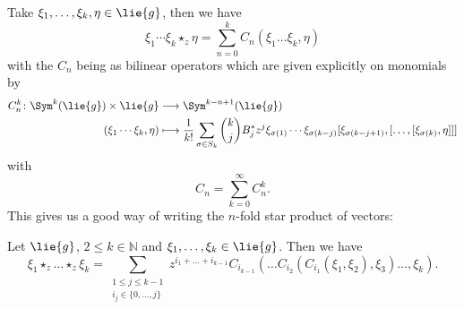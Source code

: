 Take $\xi_1, \ldots, \xi_k, \eta \in \lie{g}$, then we have
\begin{equation*}
	\xi_1 \cdots \xi_k \star_z \eta
	=
	\sum\limits_{n = 0}^k 
	C_n \left( \xi_1 \ldots \xi_k, \eta \right)
\end{equation*}
with the $C_n$ being as bilinear operators which are given explicitly 
on monomials by
\begin{align}
	\label{Formulas:MultipleStarDef1}
	C_n^k
	\colon
	\Sym^k(\lie{g})
	\times
	\lie{g}
	& 
	\longrightarrow
	\Sym^{k - n + 1}(\lie{g})
	\\
	\label{Formulas:MultipleStarDef2}
	(\xi_1 \cdots \xi_k, \eta)
	&
	\longmapsto
	\frac{1}{k!}
	\sum\limits_{\sigma \in S_k}
	\binom{k}{j} B_j^* z^j
	\xi_{\sigma(1)} \cdots \xi_{\sigma(k-j)}
	[\xi_{\sigma(k-j+1)}, [ \ldots, [\xi_{\sigma(k)}, \eta]]] 
\end{align}
with
\begin{equation*}
	C_n 
	= 
	\sum\limits_{k = 0}^{\infty}
	C_n^k.
\end{equation*}
This gives us a good way of writing the $n$-fold star product of vectors:
\begin{proposition}
	\label{Formulas:Prop:MultipleStars}
	Let $\lie{g}$, $2 \leq k \in \mathbb{N}$  and $\xi_1, \ldots, \xi_k 
	\in \lie{g}$. Then we have
	\begin{equation}
		\label{Formulas:MultipleStars}
		\xi_1 \star_z \ldots \star_z \xi_k		
		=
		\sum\limits_{\substack{
			1 \leq j \leq k-1 \\
			i_j \in \{0, \ldots, j\}
		}}
		z^{i_1 + \ldots + i_{k-1}}
		C_{i_{k-1}}
		\left(
			\ldots C_{i_2}
			\left(
				C_{i_1}
				\left( \xi_1, \xi_2 \right)
				, \xi_3	
			\right) 
			\ldots, \xi_{k}
		\right).
	\end{equation}
\end{proposition}
